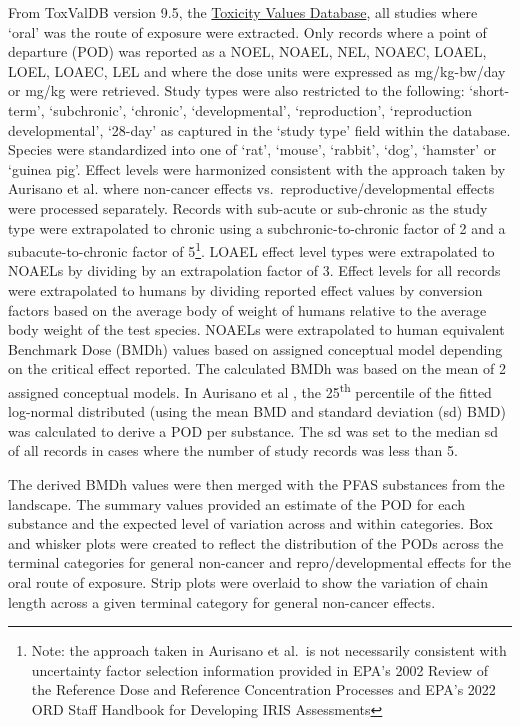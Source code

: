 \documentclass[
  super,
  preprint,
  3p]{elsarticle}
\begin{document}
From ToxValDB version 9.5, the
\href{https://www.epa.gov/comptox-tools/downloadable-computational-toxicology-data\#AT}{Toxicity
Values Database}, all studies where `oral' was the route of exposure
were extracted. Only records where a point of departure (POD) was
reported as a NOEL, NOAEL, NEL, NOAEC, LOAEL, LOEL, LOAEC, LEL and where
the dose units were expressed as mg/kg-bw/day or mg/kg were retrieved.
Study types were also restricted to the following: `short-term',
`subchronic', `chronic', `developmental', `reproduction', `reproduction
developmental', `28-day' as captured in the `study type' field within
the database. Species were standardized into one of `rat', `mouse',
`rabbit', `dog', `hamster' or `guinea pig'. Effect levels were
harmonized consistent with the approach taken by Aurisano et al.
\citep{aurisano_2023} where non-cancer effects
vs.~reproductive/developmental effects were processed separately.
Records with sub-acute or sub-chronic as the study type were
extrapolated to chronic using a subchronic-to-chronic factor of 2 and a
subacute-to-chronic factor of 5\footnote{Note: the approach taken in
  Aurisano et al.~is not necessarily consistent with uncertainty factor
  selection information provided in EPA's 2002 Review of the Reference
  Dose and Reference Concentration Processes and EPA's 2022 ORD Staff
  Handbook for Developing IRIS Assessments}. LOAEL effect level types
were extrapolated to NOAELs by dividing by an extrapolation factor of 3.
Effect levels for all records were extrapolated to humans by dividing
reported effect values by conversion factors based on the average body
of weight of humans relative to the average body weight of the test
species. NOAELs were extrapolated to human equivalent Benchmark Dose
(BMDh) values based on assigned conceptual model depending on the
critical effect reported. The calculated BMDh was based on the mean of 2
assigned conceptual models. In Aurisano et al \citep{aurisano_2023}, the
25\textsuperscript{th} percentile of the fitted log-normal distributed
(using the mean BMD and standard deviation (sd) BMD) was calculated to
derive a POD per substance. The sd was set to the median sd of all
records in cases where the number of study records was less than 5.

The derived BMDh values were then merged with the PFAS substances from
the landscape. The summary values provided an estimate of the POD for
each substance and the expected level of variation across and within
categories. Box and whisker plots were created to reflect the
distribution of the PODs across the terminal categories for general
non-cancer and repro/developmental effects for the oral route of
exposure. Strip plots were overlaid to show the variation of chain
length across a given terminal category for general non-cancer effects.
\end{document}
